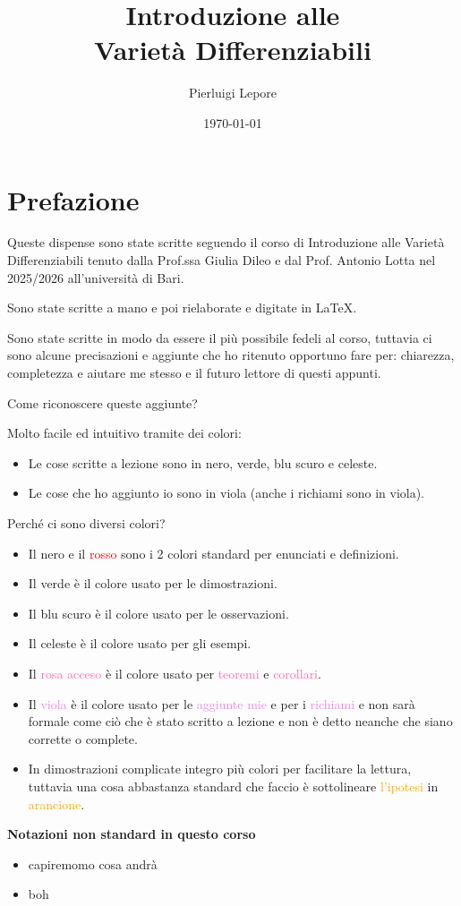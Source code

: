 \documentclass{report}
\title{Introduzione alle \\ Varietà Differenziabili}
\author{Pierluigi Lepore}
\date{\today}
\theoremstyle{obsstyle}
\theoremstyle{defstyle}
\theoremstyle{propstyle}
\theoremstyle{lemmastyle}
\theoremstyle{esempiostyle}
\theoremstyle{teoremarosa}
\theoremstyle{corollariorosa}
\theoremstyle{richiamo}
\begin{document}
\maketitle
\tableofcontents
\chapter*{Prefazione}
Queste dispense sono state scritte seguendo il corso di Introduzione alle Varietà Differenziabili tenuto dalla Prof.ssa Giulia Dileo e dal 
Prof. Antonio Lotta
nel 2025/2026 all'università di Bari.

Sono state scritte a mano e poi rielaborate e digitate in \LaTeX.

Sono state scritte in modo da essere il più possibile fedeli al corso, tuttavia ci sono alcune precisazioni e aggiunte che ho ritenuto opportuno fare per: chiarezza, completezza e aiutare me stesso 
e il futuro lettore di questi appunti.

Come riconoscere queste aggiunte?

Molto facile ed intuitivo tramite dei colori:
\begin{itemize}
  \item Le cose scritte a lezione sono in nero, verde, blu scuro e celeste.
  \item Le cose che ho aggiunto io sono in viola (anche i richiami sono in viola). 
\end{itemize}
Perché ci sono diversi colori?
\begin{itemize}
  \item Il nero e il \textcolor{red}{rosso} sono i 2 colori standard per enunciati e definizioni.
  \item Il \textcolor{green!60!black}{verde} è il colore usato per le \textcolor{green!60!black}{dimostrazioni}.
  \item Il \textcolor{blue!80!black}{blu scuro} è il colore usato per le \textcolor{blue!80!black}{osservazioni}.
  \item Il \textcolor{cyan!80!black}{celeste} è il colore usato per gli \textcolor{cyan!80!black}{esempi}.
  \item Il \textcolor{hotpink}{rosa acceso} è il colore usato per \textcolor{hotpink}{teoremi} e \textcolor{hotpink}{corollari}.
  \item Il \textcolor{violet}{viola} è il colore usato per le \textcolor{violet}{aggiunte mie} e per i \textcolor{violet}{richiami} e non sarà formale come ciò che è stato scritto a lezione e
  non è detto neanche che siano corrette o complete.
  \item In \textcolor{green!60!black}{dimostrazioni} complicate integro più colori per facilitare la lettura, tuttavia una cosa abbastanza standard che faccio
  è sottolineare \textcolor{orange}{l'ipotesi} in \textcolor{orange}{arancione}.
\end{itemize}
\textbf{Notazioni non standard in questo corso}
\begin{itemize}
\item capiremomo cosa andrà
\item boh
\end{itemize}
\end{document}
